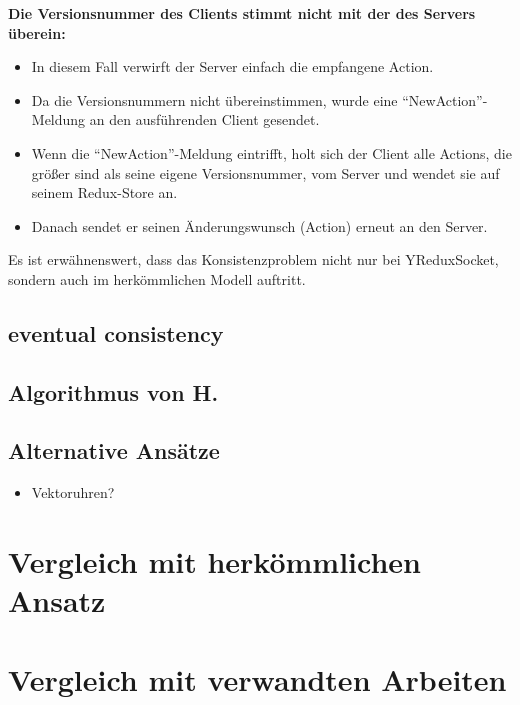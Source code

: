 \documentclass[12pt]{book}          %
\begin{document}
\textbf{Die Versionsnummer des Clients stimmt nicht mit der des Servers überein:}

\begin{itemize}
    \item In diesem Fall verwirft der Server einfach die empfangene Action.
    \item Da die Versionsnummern nicht übereinstimmen, wurde eine "`NewAction"'-Meldung an den ausführenden Client gesendet.
    \item Wenn die "`NewAction"'-Meldung eintrifft, holt sich der Client alle Actions, die größer sind als seine eigene Versionsnummer, vom Server und wendet sie auf seinem Redux-Store an.
    \item Danach sendet er seinen Änderungswunsch (Action) erneut an den Server.
\end{itemize}

Es ist erwähnenswert, dass das Konsistenzproblem nicht nur bei YReduxSocket, sondern auch im herkömmlichen Modell auftritt.

\subsection{eventual consistency}
\label{subsec-eventual-consistency}

\subsection{Algorithmus von H.}
\label{subsec-algorithmus-von-h}

\subsection{Alternative Ansätze}
\label{subsec-alternative-ansaetze}
\begin{itemize}
    \item Vektoruhren?
\end{itemize}

\section{Vergleich mit herkömmlichen Ansatz}
\label{sec-vergleich-mit-herkoemmlichen-ansatz}

\section{Vergleich mit verwandten Arbeiten}
\label{sec-vergleich-mit-verwandten-arbeiten}
\end{document}
